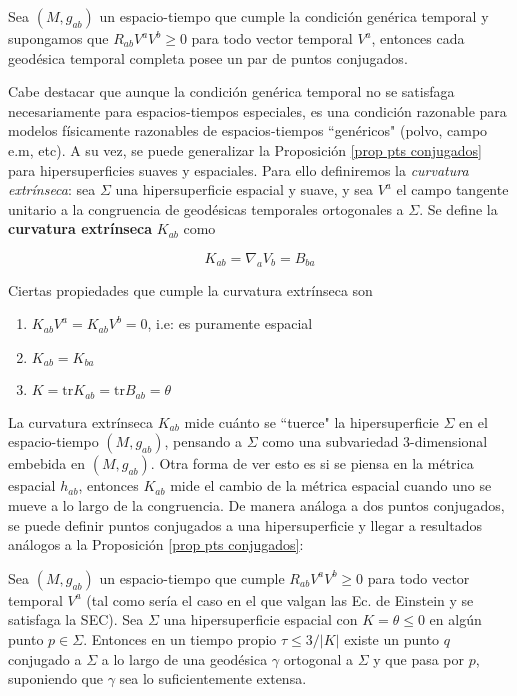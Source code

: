 \begin{proposition}\label{pts conjugados cgt}
Sea $(M,g_{ab})$ un espacio-tiempo que cumple la condición genérica temporal y supongamos que $R_{ab}V^aV^b\geq0$ para todo vector temporal $V^a$, entonces cada geodésica temporal completa posee un par de puntos conjugados.
\end{proposition}

Cabe destacar que aunque la condición genérica temporal no se satisfaga necesariamente para espacios-tiempos especiales, es una condición razonable para modelos físicamente razonables de espacios-tiempos ``genéricos" (polvo, campo e.m, etc). A su vez, se puede generalizar la Proposición \ref{prop pts conjugados} para hipersuperficies suaves y espaciales. Para ello definiremos  la \textit{curvatura extrínseca}: sea $\Sigma$ una hipersuperficie espacial y suave, y sea $V^a$ el campo tangente unitario a la congruencia de geodésicas temporales ortogonales a $\Sigma$. Se define la \textbf{curvatura extrínseca} $K_{ab}$ como 

$$
K_{ab}=\nabla_aV_b=B_{ba}
$$

Ciertas propiedades que cumple la curvatura extrínseca son

\begin{enumerate}[1)]  
    \item $K_{ab}V^a=K_{ab}V^b=0$, i.e: es puramente espacial
    \item $K_{ab}=K_{ba}$
    \item $K=\text{tr}K_{ab}=\text{tr}B_{ab}=\theta$
\end{enumerate}

La curvatura extrínseca $K_{ab}$ mide cuánto se ``tuerce" la hipersuperficie $\Sigma$ en el espacio-tiempo $(M,g_{ab})$, pensando a $\Sigma$ como una subvariedad 3-dimensional embebida en $(M,g_{ab})$. Otra forma de ver esto es si se piensa en la métrica espacial $h_{ab}$, entonces $K_{ab}$ mide el cambio de la métrica espacial cuando uno se mueve a lo largo de la congruencia. De manera análoga a dos puntos conjugados, se puede definir puntos conjugados a una hipersuperficie y llegar a resultados análogos a la Proposición \ref{prop pts conjugados}:

\begin{proposition}\label{prop pto conjugado}
Sea $(M,g_{ab})$ un espacio-tiempo que cumple $R_{ab}V^aV^b\geq0$ para todo vector temporal $V^a$ (tal como sería el caso en el que valgan las Ec. de Einstein y se satisfaga la SEC). Sea $\Sigma$ una hipersuperficie espacial con $K=\theta\leq0$ en algún punto $p\in \Sigma$. Entonces en un tiempo propio $\tau\leq3/|K|$ existe un punto $q$ conjugado a $\Sigma$ a lo largo de una geodésica $\gamma$ ortogonal a $\Sigma$ y que pasa por $p$, suponiendo que $\gamma$ sea lo suficientemente extensa.
\end{proposition}

